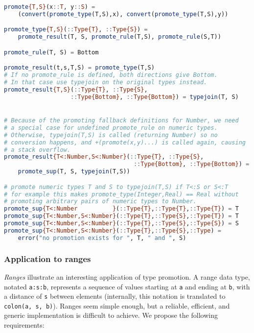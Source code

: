 \begin{singlespace}
\begin{lstlisting}[language=julia]
promote{T,S}(x::T, y::S) =
    (convert(promote_type(T,S),x), convert(promote_type(T,S),y))

promote_type{T,S}(::Type{T}, ::Type{S}) =
    promote_result(T, S, promote_rule(T,S), promote_rule(S,T))

promote_rule(T, S) = Bottom

promote_result(t,s,T,S) = promote_type(T,S)
# If no promote_rule is defined, both directions give Bottom.
# In that case use typejoin on the original types instead.
promote_result{T,S}(::Type{T}, ::Type{S},
                   ::Type{Bottom}, ::Type{Bottom}) = typejoin(T, S)


# Because of the promoting fallback definitions for Number, we need
# a special case for undefined promote_rule on numeric types.
# Otherwise, typejoin(T,S) is called (returning Number) so no
# conversion happens, and +(promote(x,y)...) is called again, causing
# a stack overflow.
promote_result{T<:Number,S<:Number}(::Type{T}, ::Type{S},
                                     ::Type{Bottom}, ::Type{Bottom}) =
    promote_sup(T, S, typejoin(T,S))

# promote numeric types T and S to typejoin(T,S) if T<:S or S<:T
# for example this makes promote_type(Integer,Real) == Real without
# promoting arbitrary pairs of numeric types to Number.
promote_sup{T<:Number          }(::Type{T},::Type{T},::Type{T}) = T
promote_sup{T<:Number,S<:Number}(::Type{T},::Type{S},::Type{T}) = T
promote_sup{T<:Number,S<:Number}(::Type{T},::Type{S},::Type{S}) = S
promote_sup{T<:Number,S<:Number}(::Type{T},::Type{S},::Type) =
    error("no promotion exists for ", T, " and ", S)
\end{lstlisting}
\end{singlespace}


\subsubsection{Application to ranges}

\emph{Ranges} illustrate an interesting application of type promotion.
A range data type, notated \texttt{a:s:b}, represents a sequence of values
starting at \texttt{a} and ending at \texttt{b}, with a distance of \texttt{s}
between elements (internally, this notation is translated to
\texttt{colon(a, s, b)}).
Ranges seem simple enough, but a reliable, efficient, and generic implementation
is difficult to achieve.
We propose the following requirements:

